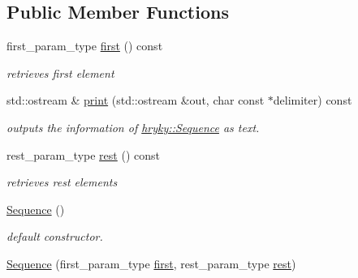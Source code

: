 \subsection*{Public Member Functions}
\begin{DoxyCompactItemize}
\item 
\hypertarget{classhryky_1_1_sequence_a881ed830dc76f92d29fe8feea122339b}{first\-\_\-param\-\_\-type \hyperlink{classhryky_1_1_sequence_a881ed830dc76f92d29fe8feea122339b}{first} () const }\label{classhryky_1_1_sequence_a881ed830dc76f92d29fe8feea122339b}

\begin{DoxyCompactList}\small\item\em retrieves first element \end{DoxyCompactList}\item 
std\-::ostream \& \hyperlink{classhryky_1_1_sequence_a8443de2eb918764c345a86b40dd888db}{print} (std\-::ostream \&out, char const $\ast$delimiter) const 
\begin{DoxyCompactList}\small\item\em outputs the information of \hyperlink{classhryky_1_1_sequence}{hryky\-::\-Sequence} as text. \end{DoxyCompactList}\item 
\hypertarget{classhryky_1_1_sequence_a11e616cd4cfe41751bbaa350fca3dcb1}{rest\-\_\-param\-\_\-type \hyperlink{classhryky_1_1_sequence_a11e616cd4cfe41751bbaa350fca3dcb1}{rest} () const }\label{classhryky_1_1_sequence_a11e616cd4cfe41751bbaa350fca3dcb1}

\begin{DoxyCompactList}\small\item\em retrieves rest elements \end{DoxyCompactList}\item 
\hypertarget{classhryky_1_1_sequence_a562adf14504f2d6569dae23904f411fb}{\hyperlink{classhryky_1_1_sequence_a562adf14504f2d6569dae23904f411fb}{Sequence} ()}\label{classhryky_1_1_sequence_a562adf14504f2d6569dae23904f411fb}

\begin{DoxyCompactList}\small\item\em default constructor. \end{DoxyCompactList}\item 
\hypertarget{classhryky_1_1_sequence_a7eabbf44a92adfa4a80d317cf2995933}{\hyperlink{classhryky_1_1_sequence_a7eabbf44a92adfa4a80d317cf2995933}{Sequence} (first\-\_\-param\-\_\-type \hyperlink{classhryky_1_1_sequence_a881ed830dc76f92d29fe8feea122339b}{first}, rest\-\_\-param\-\_\-type \hyperlink{classhryky_1_1_sequence_a11e616cd4cfe41751bbaa350fca3dcb1}{rest})}\label{classhryky_1_1_sequence_a7eabbf44a92adfa4a80d317cf2995933}


\end{DoxyCompactItemize}
